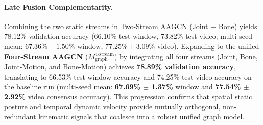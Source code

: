 \documentclass[runningheads]{llncs}
\begin{document}
\paragraph{Late Fusion Complementarity.} Combining the two static streams in Two-Stream AAGCN (Joint + Bone) yields 78.12\% validation accuracy (66.10\% test window, 73.82\% test video; multi-seed mean: $67.36\% \pm 1.50\%$ window, $77.25\% \pm 3.09\%$ video). Expanding to the unified \textbf{Four-Stream AAGCN} ($M_{\text{graph}}^{\text{4-stream}}$) by integrating all four streams (Joint, Bone, Joint-Motion, and Bone-Motion) achieves \textbf{78.89\% validation accuracy}, translating to 66.53\% test window accuracy and 74.25\% test video accuracy on the baseline run (multi-seed mean: \textbf{67.69\% $\pm$ 1.37\%} window and \textbf{77.54\% $\pm$ 2.92\%} video consensus accuracy). This progression confirms that spatial static posture and temporal dynamic velocity provide mutually orthogonal, non-redundant kinematic signals that coalesce into a robust unified graph model.

\begin{table}[!t]
\centering
\caption{Multi-stream spatial-temporal graph kinematic streams with SkelGym-Aug across validation and held-out test partitions.}
\label{tab:table4}
\end{table}
\end{document}
